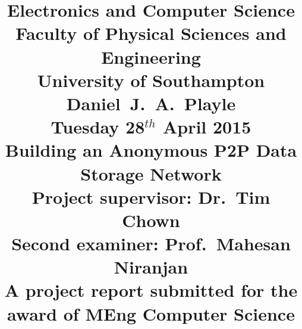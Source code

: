 \title{ \vspace{-1.0cm}
	\large{
		Electronics and Computer Science\\
		Faculty of Physical Sciences and Engineering\\
		University of Southampton\\
	}
	\large{
		\vspace{2.5cm}
		Daniel~J.~A.~Playle\\
		\vspace{1.0cm}
		Tuesday 28$^{th}$ April 2015\\
	}
		\vspace{2.5cm}
	\LARGE{
		Building an Anonymous P2P Data Storage Network\\
	}
	\large{
		\vspace{3.5cm}
		Project supervisor: Dr.~Tim Chown\\
		Second examiner: Prof.~Mahesan Niranjan\\
		\vspace{1.5cm}
		A project report submitted for the award of MEng Computer Science\vspace{-3.0cm}}
	}
\author{}
\date{}
\maketitle
